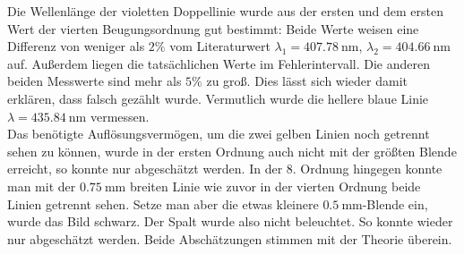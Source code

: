 \documentclass[12pt,a4paper,titlepage,headinclude,bibtotoc]{scrartcl}
\begin{document}
Die Wellenlänge der violetten Doppellinie wurde aus der ersten und dem ersten Wert der vierten Beugungsordnung gut bestimmt: Beide Werte weisen eine Differenz von weniger als $2\%$ vom Literaturwert $\lambda_1=407.78~$nm, $ \lambda_2=404.66~$nm auf.
Außerdem liegen die tatsächlichen Werte im Fehlerintervall.
Die anderen beiden Messwerte sind mehr als $5\%$ zu groß.
Dies lässt sich wieder damit erklären, dass falsch gezählt wurde.
Vermutlich wurde die hellere blaue Linie $\lambda=435.84~$nm vermessen.\\

Das benötigte Auflösungsvermögen, um die zwei gelben Linien noch getrennt sehen zu können, wurde in der ersten Ordnung auch nicht mit der größten Blende erreicht, so konnte nur abgeschätzt werden.
In der 8. Ordnung hingegen konnte man mit der $0.75~$mm breiten Linie wie zuvor in der vierten Ordnung beide Linien getrennt sehen.
Setze man aber die etwas kleinere $0.5~$mm-Blende ein, wurde das Bild schwarz.
Der Spalt wurde also nicht beleuchtet.
So konnte wieder nur abgeschätzt werden.
Beide Abschätzungen stimmen mit der Theorie überein.



\end{document}
